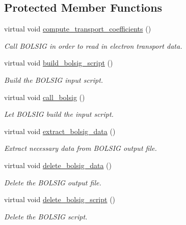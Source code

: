 \subsection*{Protected Member Functions}
\begin{DoxyCompactItemize}
\item 
virtual void \hyperlink{classair__bolsig_a07ac4dddb2d81d7d8928e9940205424a}{compute\+\_\+transport\+\_\+coefficients} ()
\begin{DoxyCompactList}\small\item\em Call B\+O\+L\+S\+IG in order to read in electron transport data. \end{DoxyCompactList}\item 
virtual void \hyperlink{classair__bolsig_a217d7b5f9e56fbacefc434c8824a1ea3}{build\+\_\+bolsig\+\_\+script} ()
\begin{DoxyCompactList}\small\item\em Build the B\+O\+L\+S\+IG input script. \end{DoxyCompactList}\item 
virtual void \hyperlink{classair__bolsig_ae9820fcb32aad47cfc717bb9a4e306bb}{call\+\_\+bolsig} ()
\begin{DoxyCompactList}\small\item\em Let B\+O\+L\+S\+IG build the input script. \end{DoxyCompactList}\item 
virtual void \hyperlink{classair__bolsig_a75c8608b8993288555e8e0bbc0289b1a}{extract\+\_\+bolsig\+\_\+data} ()
\begin{DoxyCompactList}\small\item\em Extract necessary data from B\+O\+L\+S\+IG output file. \end{DoxyCompactList}\item 
virtual void \hyperlink{classair__bolsig_a714f8d9d980430a7ef3fbb2598a8287a}{delete\+\_\+bolsig\+\_\+data} ()
\begin{DoxyCompactList}\small\item\em Delete the B\+O\+L\+S\+IG output file. \end{DoxyCompactList}\item 
virtual void \hyperlink{classair__bolsig_ae110cc961aa9c566f03d61aa97d8923c}{delete\+\_\+bolsig\+\_\+script} ()
\begin{DoxyCompactList}\small\item\em Delete the B\+O\+L\+S\+IG script. \end{DoxyCompactList}\item 

\end{DoxyCompactItemize}
